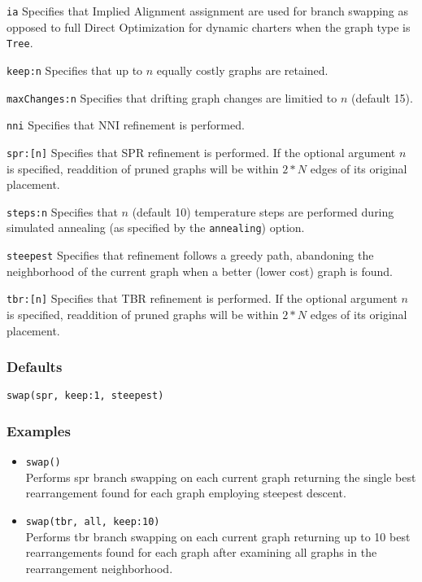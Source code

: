 \documentclass[11pt]{article}
\begin{document}
		\smallskip		
		\noindent \texttt{ia} Specifies that Implied Alignment \citep{Wheeler2003} assignment are used for branch swapping as opposed to full Direct Optimization for dynamic charters
		when the graph type is \texttt{Tree}.
		
		\smallskip		
		\noindent \texttt{keep:n} Specifies that up to $n$ equally costly graphs are retained.
		
		\smallskip		
		\noindent \texttt{maxChanges:n} Specifies that drifting graph changes are limitied to $n$ (default 15).
		
		\smallskip		
		\noindent \texttt{nni} Specifies that NNI refinement \citep{CaminandSokal1965, Robinson1971} is performed.
		
		\smallskip		
		\noindent \texttt{spr:[n]} Specifies that SPR refinement \citep{Dayhoff1969} is performed.  If the optional argument $n$ is specified, readdition of pruned graphs will
		be within $2 * N$ edges of its original placement.
		
		\smallskip		
		\noindent \texttt{steps:n} Specifies that $n$ (default 10) temperature steps are performed during simulated annealing (as specified by the \texttt{annealing}) option.
		
		\smallskip		
		\noindent \texttt{steepest} Specifies that refinement follows a greedy path, abandoning the neighborhood of the current graph when a better (lower cost)
		graph is found.
		
		\noindent \texttt{tbr:[n]} Specifies that TBR refinement \citep{Farris1988, swofford1990a} is performed.  If the optional argument $n$ is specified, readdition of pruned graphs will
		be within $2 * N$ edges of its original placement.
		
		\subsubsection{Defaults}
		\texttt{swap(spr, keep:1, steepest)}
		
		\subsubsection{Examples}
			\begin{itemize}
				\item{\texttt{swap()}\\Performs spr branch swapping on each current graph returning the single best rearrangement found for each graph  employing steepest descent.}
				\item{\texttt{swap(tbr, all, keep:10)}\\Performs tbr branch swapping on each current graph returning up to 10 best rearrangements found for each graph after examining all 
				graphs in the rearrangement neighborhood.}
			
			\end{itemize}
		
\end{document}

